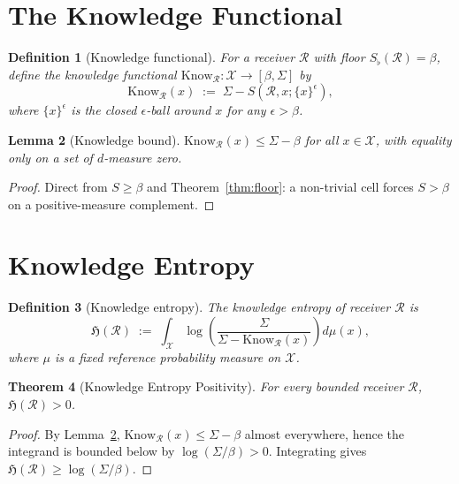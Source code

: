 \documentclass[twocolumn,11pt,a4paper]{article}
\newtheorem{theorem}{Theorem}[section]
\newtheorem{lemma}[theorem]{Lemma}
\newtheorem{definition}[theorem]{Definition}
\newcommand{\Cands}{\mathcal{X}}
\newcommand{\receiver}{\mathcal{R}}
\newcommand{\Sigmax}{\Sigma}
\newcommand{\Sscalar}{S}
\newcommand{\Sfloor}{S_{\flat}}
\newcommand{\Know}{\mathrm{Know}}
\newcommand{\Hknow}{\mathfrak{H}}
\begin{document}
\section{The Knowledge Functional}
\label{sec:knowledge-functional}

\begin{definition}[Knowledge functional]
\label{def:knowledge-functional}
For a receiver $\receiver$ with floor $\Sfloor(\receiver) = \beta$, define the \emph{knowledge functional} $\Know_{\receiver} : \Cands \to [\beta, \Sigmax]$ by
\[
\Know_{\receiver}(x) \;:=\; \Sigmax - \Sscalar(\receiver, x; \{x\}^{\epsilon}),
\]
where $\{x\}^{\epsilon}$ is the closed $\epsilon$-ball around $x$ for any $\epsilon > \beta$.
\end{definition}

\begin{lemma}[Knowledge bound]
\label{lem:know-bound}
$\Know_{\receiver}(x) \leq \Sigmax - \beta$ for all $x \in \Cands$, with equality only on a set of $d$-measure zero.
\end{lemma}

\begin{proof}
Direct from $\Sscalar \geq \beta$ and Theorem~\ref{thm:floor}: a non-trivial cell forces $\Sscalar > \beta$ on a positive-measure complement.
\end{proof}

\section{Knowledge Entropy}
\label{sec:knowledge-entropy}

\begin{definition}[Knowledge entropy]
\label{def:knowledge-entropy}
The \emph{knowledge entropy} of receiver $\receiver$ is
\[
\Hknow(\receiver) \;:=\; \int_{\Cands} \log\left(\frac{\Sigmax}{\Sigmax - \Know_{\receiver}(x)}\right) d\mu(x),
\]
where $\mu$ is a fixed reference probability measure on $\Cands$.
\end{definition}

\begin{theorem}[Knowledge Entropy Positivity]
\label{thm:know-entropy-positive}
For every bounded receiver $\receiver$, $\Hknow(\receiver) > 0$.
\end{theorem}

\begin{proof}
By Lemma~\ref{lem:know-bound}, $\Know_{\receiver}(x) \leq \Sigmax - \beta$ almost everywhere, hence the integrand is bounded below by $\log(\Sigmax/\beta) > 0$. Integrating gives $\Hknow(\receiver) \geq \log(\Sigmax/\beta)$.
\end{proof}
\end{document}
